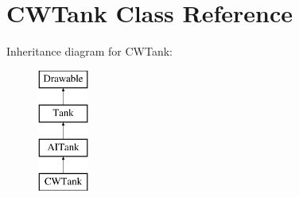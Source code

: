 \hypertarget{class_c_w_tank}{}\section{C\+W\+Tank Class Reference}
\label{class_c_w_tank}
Inheritance diagram for C\+W\+Tank\+:\begin{figure}[H]
\begin{center}
\leavevmode
\includegraphics[height=4.000000cm]{class_c_w_tank}
\end{center}
\end{figure}
